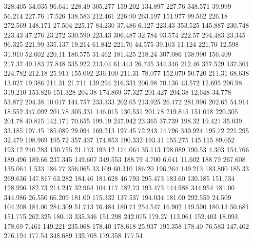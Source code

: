  328.405   34.035   96.641       228.49
 305.277  159.202  134.897       227.76
 348.571   39.999   56.214       227.76
  17.526  138.583  212.461       226.90
 263.197  151.977   99.562       226.18
 272.569  148.171   27.504       225.17
  84.230   37.486    6.127       223.43
 353.525  145.887  230.748       223.43
  47.276   23.272  330.590       223.43
 306.487   32.784   93.574       222.57
 294.483   23.345   96.325       221.99
 335.137   19.214   61.842       221.70
  44.575   39.103   11.124       221.70
  12.598   31.910   52.602       220.11
 186.575   31.462  181.425       218.24
 307.086  138.990  156.409       217.37
  49.183   27.848  335.922       213.04
  61.443   26.745  344.346       212.46
 357.529  137.361  224.782       212.18
  25.913  155.092  236.100       211.31
  78.077  152.070   50.720       211.31
  68.638   13.027   19.386       211.31
  21.711  139.294  216.331       206.98
  70.136   43.572   12.695       206.98
 319.210  153.826  151.328       204.38
 174.869   37.327  201.427       204.38
  12.648   34.778   53.872       204.38
  10.017  144.757  233.333       202.65
 213.925   26.472  281.996       202.65
  54.914   18.552  347.092       201.78
 305.331  146.015  130.531       201.78
 219.845  151.018  220.305       201.78
  40.815  142.171   70.655       199.19
 247.942   23.365   37.739       198.32
  19.421   35.039   33.185       197.45
 185.089   29.094  169.213       197.45
  72.243   14.796  340.924       195.72
 221.295   32.479  108.969       195.72
 357.437  174.853  190.332       193.41
 155.275  145.115   89.052       193.12
 240.283  130.755   21.173       193.12
 174.064   35.113  198.089       190.53
   4.303  154.766  189.496       189.66
 237.345  149.607  349.553       188.79
   4.700    6.641   11.602       188.79
 267.608  135.064    1.533       186.77
 356.065   33.109   60.310       186.20
 196.264  149.213  183.800       185.33
 269.636  147.817   63.282       184.46
 181.628   46.793  295.473       183.60
 130.185  151.734  128.996       182.73
 214.247   32.964  104.117       182.73
 193.473  144.988  344.954       181.00
 344.986   26.550   66.209       181.00
 175.332  137.537  194.034       181.00
 292.559   24.509  104.208       181.00
 284.309   51.713   76.484       180.71
 254.547   16.902  119.590       180.13
  50.681  151.775  262.325       180.13
 335.346  151.298  242.075       179.27
 113.961  152.403   18.093       178.69
   7.461  149.221  235.068       178.40
 178.618   25.937  195.358       178.40
  76.583  147.402  276.194       177.54
 348.689  139.708  179.358       177.54
